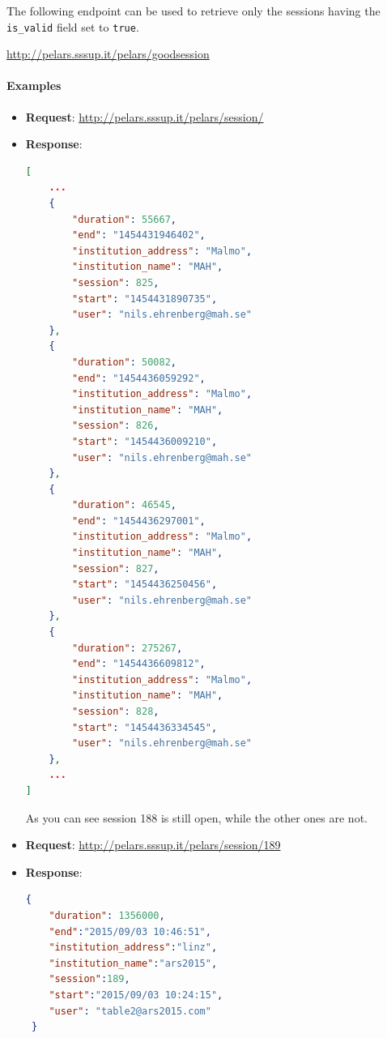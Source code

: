 \documentclass[a4paper,notitlepage,onecolumn]{hitec}  %
\begin{document}
The following endpoint can be used to retrieve only the sessions having the {\tt is\_valid} field set to {\tt true}.
\begin{center}
\url{http://pelars.sssup.it/pelars/goodsession}
\end{center}

\paragraph{Examples}
\begin{itemize}
\item \textbf{Request}:  \url{http://pelars.sssup.it/pelars/session/} 
\item \textbf{Response}: 
\begin{lstlisting}[language=json,firstnumber=1]
[  
	...
    {
        "duration": 55667,
        "end": "1454431946402",
        "institution_address": "Malmo",
        "institution_name": "MAH",
        "session": 825,
        "start": "1454431890735",
        "user": "nils.ehrenberg@mah.se"
    },
    {
        "duration": 50082,
        "end": "1454436059292",
        "institution_address": "Malmo",
        "institution_name": "MAH",
        "session": 826,
        "start": "1454436009210",
        "user": "nils.ehrenberg@mah.se"
    },
    {
        "duration": 46545,
        "end": "1454436297001",
        "institution_address": "Malmo",
        "institution_name": "MAH",
        "session": 827,
        "start": "1454436250456",
        "user": "nils.ehrenberg@mah.se"
    },
    {
        "duration": 275267,
        "end": "1454436609812",
        "institution_address": "Malmo",
        "institution_name": "MAH",
        "session": 828,
        "start": "1454436334545",
        "user": "nils.ehrenberg@mah.se"
    },
    ...
]
\end{lstlisting}
As you can see session 188 is still open, while the other ones are not.
\end{itemize}

\begin{itemize}
\item \textbf{Request}:  \url{http://pelars.sssup.it/pelars/session/189} 
\item \textbf{Response}: 
\begin{lstlisting}[language=json,firstnumber=1]
 {  
   	"duration": 1356000,
    "end":"2015/09/03 10:46:51",
    "institution_address":"linz",
    "institution_name":"ars2015",
    "session":189,
    "start":"2015/09/03 10:24:15",
    "user": "table2@ars2015.com"
 }
\end{lstlisting}
\end{itemize}
\end{document}
